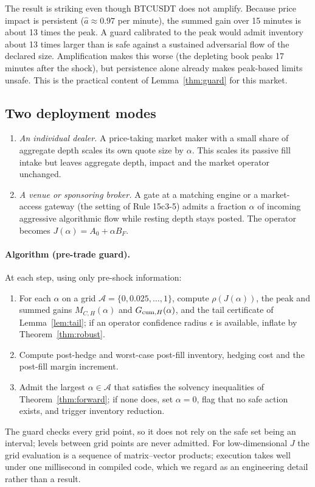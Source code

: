 The result is striking even though BTCUSDT does not amplify. Because price impact is persistent ($\hat a\approx0.97$ per minute), the summed gain over 15 minutes is about 13 times the peak. A guard calibrated to the peak would admit inventory about 13 times larger than is safe against a sustained adversarial flow of the declared size. Amplification makes this worse (the depleting book peaks 17 minutes after the shock), but persistence alone already makes peak-based limits unsafe. This is the practical content of Lemma~\ref{thm:guard} for this market.

\subsection{Two deployment modes}

\begin{enumerate}[label=\textbf{Mode \Alph*.},leftmargin=*]
\item \emph{An individual dealer.} A price-taking market maker with a small share of aggregate depth scales its own quote size by $\alpha$. This scales its passive fill intake but leaves aggregate depth, impact and the market operator unchanged.
\item \emph{A venue or sponsoring broker.} A gate at a matching engine or a market-access gateway (the setting of Rule 15c3-5) admits a fraction $\alpha$ of incoming aggressive algorithmic flow while resting depth stays posted. The operator becomes $J(\alpha)=A_0+\alpha B_F$.
\end{enumerate}

\paragraph{Algorithm (pre-trade guard).} At each step, using only pre-shock information:
\begin{enumerate}[itemsep=1pt]
\item For each $\alpha$ on a grid $\mathcal A=\{0,0.025,\ldots,1\}$, compute $\rho(J(\alpha))$, the peak and summed gains $M_{C,H}(\alpha)$ and $G_{{\rm cum},H}(\alpha)$, and the tail certificate of Lemma~\ref{lem:tail}; if an operator confidence radius $\epsilon$ is available, inflate by Theorem~\ref{thm:robust}.
\item Compute post-hedge and worst-case post-fill inventory, hedging cost and the post-fill margin increment.
\item Admit the largest $\alpha\in\mathcal A$ that satisfies the solvency inequalities of Theorem~\ref{thm:forward}; if none does, set $\alpha=0$, flag that no safe action exists, and trigger inventory reduction.
\end{enumerate}
The guard checks every grid point, so it does not rely on the safe set being an interval; levels between grid points are never admitted. For low-dimensional $J$ the grid evaluation is a sequence of matrix--vector products; execution takes well under one millisecond in compiled code, which we regard as an engineering detail rather than a result.

